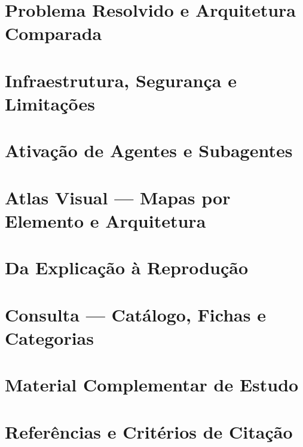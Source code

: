 \documentclass[11pt,a4paper,oneside,openany]{book}
\begin{document}
\part{Problema Resolvido e Arquitetura Comparada}


\part{Infraestrutura, Segurança e Limitações}


\part{Ativação de Agentes e Subagentes}


\part{Atlas Visual — Mapas por Elemento e Arquitetura}





\part{Da Explicação à Reprodução}




\appendix
\part{Consulta — Catálogo, Fichas e Categorias}




\part{Material Complementar de Estudo}



\part{Referências e Critérios de Citação}

\end{document}

